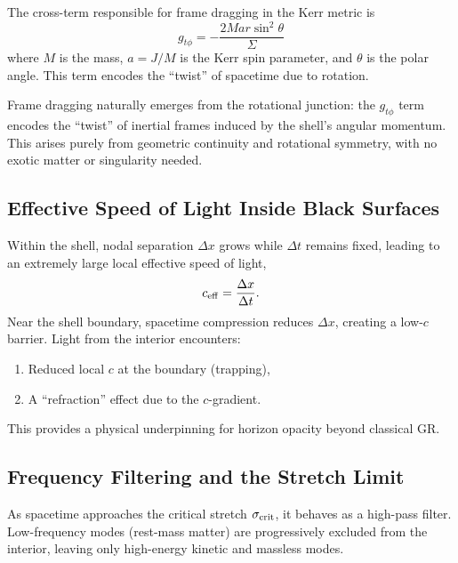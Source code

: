 \documentclass[12pt]{article}
\begin{document}
The cross-term responsible for frame dragging in the Kerr metric is
\begin{equation}
g_{t\phi} = - \frac{2 M a r \sin^2\theta}{\Sigma}
\end{equation}
where $M$ is the mass, $a = J/M$ is the Kerr spin parameter, and $\theta$ is the polar angle. This term encodes the “twist” of spacetime due to rotation.

Frame dragging naturally emerges from the rotational junction: the \(g_{t\phi}\) term encodes the “twist” of inertial frames induced by the shell's angular momentum. This arises purely from geometric continuity and rotational symmetry, with no exotic matter or singularity needed.

\subsection{Effective Speed of Light Inside Black Surfaces}

Within the shell, nodal separation \(\Delta x\) grows while \(\Delta t\) remains fixed, leading to an extremely large local effective speed of light,
\[
c_{\rm eff} = \frac{\Delta x}{\Delta t}.
\]
Near the shell boundary, spacetime compression reduces \(\Delta x\), creating a low-\(c\) barrier. Light from the interior encounters:
\begin{enumerate}
    \item Reduced local \(c\) at the boundary (trapping),
    \item A “refraction” effect due to the \(c\)-gradient.
\end{enumerate}

This provides a physical underpinning for horizon opacity beyond classical GR.

\subsection{Frequency Filtering and the Stretch Limit}

As spacetime approaches the critical stretch \(\sigma_{\rm crit}\), it behaves as a high-pass filter. Low-frequency modes (rest-mass matter) are progressively excluded from the interior, leaving only high-energy kinetic and massless modes.
\end{document}
